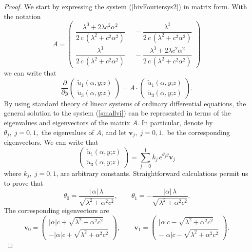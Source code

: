 \documentclass[10pt,a4paper]{amsart}
\begin{document}
\begin{proof}
We start by expressing the system (\ref{bivFouriersys2}) in matrix form. With the notation
$$A=\begin{pmatrix}
\dfrac{\lambda^3+2\lambda c^2\alpha^2}{2\,c\,(\lambda^2+c^2\alpha^2)}\; & \; -\dfrac{\lambda^3}{2\,c\,(\lambda^2+c^2\alpha^2)}\\
\dfrac{\lambda^3}{2\,c\,(\lambda^2+c^2\alpha^2)}\; & \; -\dfrac{\lambda^3+2\lambda c^2\alpha^2}{2\,c\,(\lambda^2+c^2\alpha^2)}
\end{pmatrix}$$
we can write that
\begin{equation}\label{smallvi}\frac{\partial}{\partial y}\begin{pmatrix}\widetilde{u}_1(\alpha,y\mathord{;}z)\\[0.5em] \widetilde{u}_3(\alpha,y\mathord{;}z)\end{pmatrix}=A\cdot\begin{pmatrix}\widetilde{u}_1(\alpha,y\mathord{;}z)\\[0.5em] \widetilde{u}_3(\alpha,y\mathord{;}z)\end{pmatrix}.\end{equation}
By using standard theory of linear systems of ordinary differential equations, the general solution to the system (\ref{smallvi}) can be represented in terms of the eigenvalues and eigenvectors of the matrix $A$. In particular, denote by $\theta_j,\;j=0,1,$ the eigenvalues of $A$, and let $\mathbf{v}_j,\;j=0,1,$ be the corresponding eigenvectors. We can write that 
$$\begin{pmatrix}\widetilde{u}_1(\alpha,y\mathord{;}z)\\[0.5em] \widetilde{u}_3(\alpha,y\mathord{;}z)\end{pmatrix}=\sum_{j=0}^1k_j\,e^{\theta_j y}\mathbf{v}_j$$ where $k_j,\;j=0,1$, are arbitrary constants. Straightforward calculations permit us to prove that
$$\theta_0=\frac{\lvert\alpha\lvert\,\lambda}{\sqrt{\lambda^2+\alpha^2c^2}},\qquad \theta_1=-\frac{\lvert\alpha\lvert\,\lambda}{\sqrt{\lambda^2+\alpha^2c^2}}.$$ The corresponding eigenvectors are
$$\mathbf{v}_0=\begin{pmatrix}\lvert\alpha\lvert c+\sqrt{\lambda^2+\alpha^2c^2}\\[0.75em]-\lvert\alpha\lvert c+\sqrt{\lambda^2+\alpha^2c^2}\end{pmatrix},\qquad \mathbf{v}_1=\begin{pmatrix}\lvert\alpha\lvert c-\sqrt{\lambda^2+\alpha^2c^2}\\[0.75em]-\lvert\alpha\lvert c-\sqrt{\lambda^2+\alpha^2c^2}\end{pmatrix}.$$

\end{proof}
\end{document}
